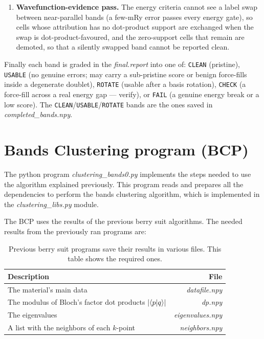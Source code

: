 \documentclass[a4paper,12pt]{report}
\begin{document}
\begin{appendices}
\begin{enumerate}
    \item \textbf{Wavefunction-evidence pass.} The energy criteria cannot see a label swap between near-parallel bands (a few-mRy error passes every energy gate), so cells whose attribution has no dot-product support are exchanged when the swap is dot-product-favoured, and the zero-support cells that remain are demoted, so that a silently swapped band cannot be reported clean.
\end{enumerate}

Finally each band is graded in the \textit{final.report} into one of: \texttt{CLEAN} (pristine), \texttt{USABLE} (no genuine errors; may carry a sub-pristine score or benign force-fills inside a degenerate doublet), \texttt{ROTATE} (usable after a basis rotation), \texttt{CHECK} (a force-fill across a real energy gap --- verify), or \texttt{FAIL} (a genuine energy break or a low score). The \texttt{CLEAN}/\texttt{USABLE}/\texttt{ROTATE} bands are the ones saved in \textit{completed\_bands.npy}.


\section{Bands Clustering program (BCP)}

The python program \textit{clustering\_bands0.py} implements the steps needed to use the algorithm explained previously. This program reads and prepares all the dependencies to perform the bands clustering algorithm, which is implemented in the \textit{clustering\_libs.py} module.

The BCP uses the results of the previous berry suit algorithms. The needed results from the previously ran programs are:

\begin{table}[H]
    \center
    \caption{Previous berry suit programs save their results in various files. This table shows the required ones.}
    \begin{tabular}{lr}
        \hline
        Description & File \\
        \hline
        The material's main data & \textit{datafile.npy}\\
        The modulus of Bloch's factor dot products $\left|\braket{p}{q}\right|$ & \textit{dp.npy}\\
        The eigenvalues & \textit{eigenvalues.npy}\\
        A list with the neighbors of each $k$-point & \textit{neighbors.npy}\\


\end{tabular}
\end{table}
\end{appendices}
\end{document}

